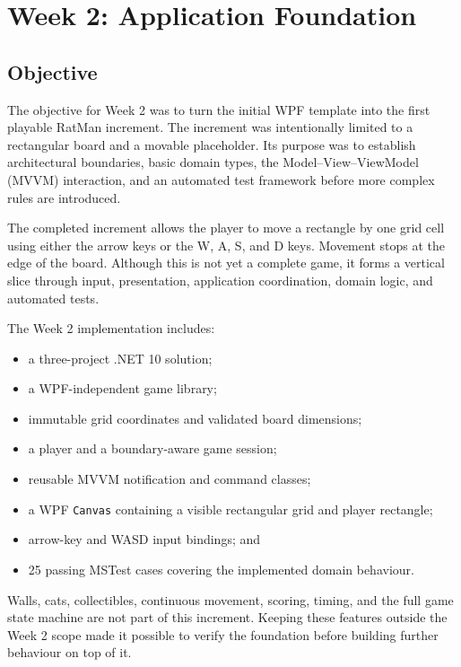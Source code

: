 
\chapter{Week 2: Application Foundation}
\label{chap:week2-foundation}

\section{Objective}

The objective for Week 2 was to turn the initial WPF template into the first playable RatMan increment. The increment was intentionally limited to a rectangular board and a movable placeholder. Its purpose was to establish architectural boundaries, basic domain types, the Model--View--ViewModel (MVVM) interaction, and an automated test framework before more complex rules are introduced.

The completed increment allows the player to move a rectangle by one grid cell using either the arrow keys or the W, A, S, and D keys. Movement stops at the edge of the board. Although this is not yet a complete game, it forms a vertical slice through input, presentation, application coordination, domain logic, and automated tests.

The Week 2 implementation includes:

\begin{itemize}
	\item a three-project .NET 10 solution;
	\item a WPF-independent game library;
	\item immutable grid coordinates and validated board dimensions;
	\item a player and a boundary-aware game session;
	\item reusable MVVM notification and command classes;
	\item a WPF \texttt{Canvas} containing a visible rectangular grid and player rectangle;
	\item arrow-key and WASD input bindings; and
	\item 25 passing MSTest cases covering the implemented domain behaviour.
\end{itemize}

Walls, cats, collectibles, continuous movement, scoring, timing, and the full game state machine are not part of this increment. Keeping these features outside the Week 2 scope made it possible to verify the foundation before building further behaviour on top of it.

